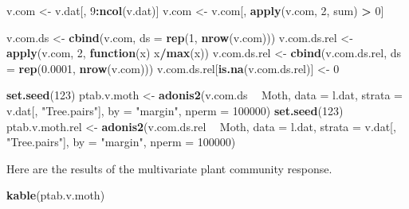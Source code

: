 \documentclass[]{article}
\newenvironment{Shaded}{\begin{snugshade}}{\end{snugshade}}
\newcommand{\KeywordTok}[1]{\textcolor[rgb]{0.13,0.29,0.53}{\textbf{#1}}}
\newcommand{\DataTypeTok}[1]{\textcolor[rgb]{0.13,0.29,0.53}{#1}}
\newcommand{\DecValTok}[1]{\textcolor[rgb]{0.00,0.00,0.81}{#1}}
\newcommand{\FloatTok}[1]{\textcolor[rgb]{0.00,0.00,0.81}{#1}}
\newcommand{\StringTok}[1]{\textcolor[rgb]{0.31,0.60,0.02}{#1}}
\newcommand{\ControlFlowTok}[1]{\textcolor[rgb]{0.13,0.29,0.53}{\textbf{#1}}}
\newcommand{\OperatorTok}[1]{\textcolor[rgb]{0.81,0.36,0.00}{\textbf{#1}}}
\newcommand{\NormalTok}[1]{#1}
\begin{document}
\begin{Shaded}
\begin{Highlighting}[]
\NormalTok{v.com <-}\StringTok{ }\NormalTok{v.dat[, }\DecValTok{9}\OperatorTok{:}\KeywordTok{ncol}\NormalTok{(v.dat)]}
\NormalTok{v.com <-}\StringTok{ }\NormalTok{v.com[, }\KeywordTok{apply}\NormalTok{(v.com, }\DecValTok{2}\NormalTok{, sum) }\OperatorTok{>}\StringTok{ }\DecValTok{0}\NormalTok{]}

\NormalTok{v.com.ds <-}\StringTok{ }\KeywordTok{cbind}\NormalTok{(v.com, }\DataTypeTok{ds =} \KeywordTok{rep}\NormalTok{(}\DecValTok{1}\NormalTok{, }\KeywordTok{nrow}\NormalTok{(v.com)))}
\NormalTok{v.com.ds.rel <-}\StringTok{ }\KeywordTok{apply}\NormalTok{(v.com, }\DecValTok{2}\NormalTok{, }\ControlFlowTok{function}\NormalTok{(x) x}\OperatorTok{/}\KeywordTok{max}\NormalTok{(x))}
\NormalTok{v.com.ds.rel <-}\StringTok{ }\KeywordTok{cbind}\NormalTok{(v.com.ds.rel, }\DataTypeTok{ds =} \KeywordTok{rep}\NormalTok{(}\FloatTok{0.0001}\NormalTok{, }\KeywordTok{nrow}\NormalTok{(v.com)))}
\NormalTok{v.com.ds.rel[}\KeywordTok{is.na}\NormalTok{(v.com.ds.rel)] <-}\StringTok{ }\DecValTok{0}

\KeywordTok{set.seed}\NormalTok{(}\DecValTok{123}\NormalTok{)}
\NormalTok{ptab.v.moth <-}\StringTok{ }\KeywordTok{adonis2}\NormalTok{(v.com.ds }\OperatorTok{~}\StringTok{ }\NormalTok{Moth, }\DataTypeTok{data =}\NormalTok{ l.dat, }
                    \DataTypeTok{strata =}\NormalTok{ v.dat[, }\StringTok{"Tree.pairs"}\NormalTok{], }
                    \DataTypeTok{by =} \StringTok{"margin"}\NormalTok{, }\DataTypeTok{nperm =} \DecValTok{100000}\NormalTok{)}
\KeywordTok{set.seed}\NormalTok{(}\DecValTok{123}\NormalTok{)}
\NormalTok{ptab.v.moth.rel <-}\StringTok{ }\KeywordTok{adonis2}\NormalTok{(v.com.ds.rel }\OperatorTok{~}\StringTok{ }\NormalTok{Moth, }\DataTypeTok{data =}\NormalTok{ l.dat, }
                         \DataTypeTok{strata =}\NormalTok{ v.dat[, }\StringTok{"Tree.pairs"}\NormalTok{], }
                         \DataTypeTok{by =} \StringTok{"margin"}\NormalTok{, }\DataTypeTok{nperm =} \DecValTok{100000}\NormalTok{)}
\end{Highlighting}
\end{Shaded}

Here are the results of the multivariate plant community response.

\begin{Shaded}
\begin{Highlighting}[]
\KeywordTok{kable}\NormalTok{(ptab.v.moth)}
\end{Highlighting}
\end{Shaded}
\end{document}

